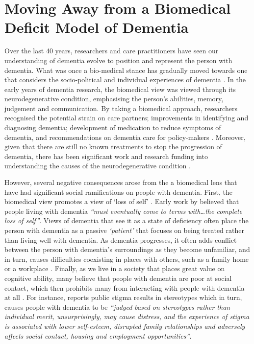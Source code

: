 \section{Moving Away from a Biomedical Deficit Model of Dementia}
\label{BL:DementiaHCI}
Over the last 40 years, researchers and care practitioners have seen our understanding of dementia evolve to position and represent the person with dementia. What was once a bio-medical stance has gradually moved towards one that considers the socio-political and individual experiences of dementia \citep{bellass_broadening_2019}. In the early years of dementia research, the biomedical view was viewed through its neurodegenerative condition, emphasising the person's abilities, memory, judgement and communication. By taking a biomedical approach, researchers recognised the potential strain on care partners; improvements in identifying and diagnosing dementia; development of medication to reduce symptoms of dementia, and recommendations on dementia care for policy-makers \citep{doi:10.1080/13607863.2019.1693968}. Moreover, given that there are still no known treatments to stop the progression of dementia, there has been significant work and research funding into understanding the causes of the neurodegenerative condition \citep{bature_signs_2017}.

However, several negative consequences arose from the a biomedical lens that have had significant social ramifications on people with dementia. First, the biomedical view promotes a view of `loss of self' \citep{ryan_dementia_2009}. Early work by \cite{cohen_loss_1986} believed that people living with dementia \textit{``must eventually come to terms with…the complete loss of self''}. Views of dementia that see it as a state of deficiency often place the person with dementia as a passive \textit{`patient'} that focuses on being treated rather than living well with dementia. As dementia progresses, it often adds conflict between the person with dementia's surroundings as they become unfamiliar, and in turn, causes difficulties coexisting in places with others, such as a family home or a workplace \citep{langdon_making_2007}. Finally, as we live in a society that places great value on cognitive ability, many believe that people with dementia are poor at social contact, which then prohibits many from interacting with people with dementia at all \citep{killick_communication_2001}. For instance, \cite{mukadam2012reducing} reports public stigma results in stereotypes which in turn, causes people with dementia to be \textit{``judged based on stereotypes rather than individual merit, unsurprisingly, may cause distress, and the experience of stigma is associated with
lower self-esteem, disrupted family relationships
and adversely affects social contact, housing and
employment opportunities''}.

